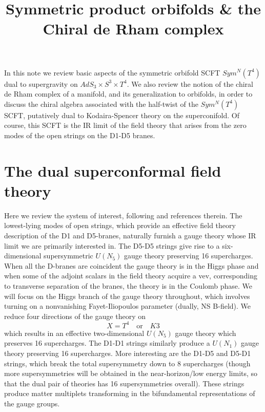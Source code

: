 \documentclass[11pt]{amsart}
\date{}
\title{Symmetric product orbifolds \& the Chiral de Rham complex}
\theoremstyle{thm}
\numberwithin{equation}{subsection}
\theoremstyle{def}
\theoremstyle{rem}
\begin{document}
 
\maketitle

In this note we review basic aspects of the symmetric orbifold SCFT $Sym^N(T^4)$ dual to supergravity on $AdS_3 \times S^3 \times T^4$. We also review the notion of the chiral de Rham complex of a manifold, and its generalization to orbifolds, in order to discuss the chiral algebra associated with the half-twist of the $Sym^N(T^4)$ SCFT, putatively dual to Kodaira-Spencer theory on the superconifold. Of course, this SCFT is the IR limit of the field theory that arises from the zero modes of the open strings on the D1-D5 branes. 

\section{The dual superconformal field theory}

Here we review the system of interest, following \cite{Davidetal} and references therein. The lowest-lying modes of open strings, which provide an effective field theory description of the D1 and D5-branes, naturally furnish a gauge theory whose IR limit we are primarily interested in.  
The D5-D5 strings give rise to a six-dimensional supersymmetric $U(N_5)$ gauge theory preserving 16 supercharges. 
When all the D-branes are coincident the gauge theory is in the Higgs phase and when some of the adjoint scalars in the field theory acquire a vev, corresponding to transverse separation of the branes, the theory is in the Coulomb phase. 
We will focus on the Higgs branch of the gauge theory throughout, which involves turning on a nonvanishing Fayet-Iliopoulos parameter (dually, NS B-field). 
We reduce four directions of the gauge theory on 
\[
X = T^4 \quad \text{or} \quad K3
\]
which results in an effective two-dimensional $U(N_5)$ gauge theory which preserves 16 supercharges.
The D1-D1 strings similarly produce a $U(N_1)$ gauge theory preserving 16 supercharges. 
More interesting are the D1-D5 and D5-D1 strings, which break the total supersymmetry down to 8 supercharges (though more supersymmetries will be obtained in the near-horizon/low energy limits, so that the dual pair of theories has 16 supersymmetries overall). 
These strings produce matter multiplets transforming in the bifundamental representations of the gauge groups. 
\end{document}

